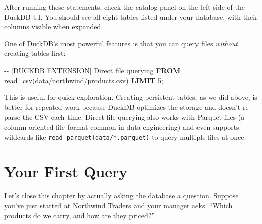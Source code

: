\documentclass[
  letterpaper,
  DIV=11,
  numbers=noendperiod]{scrreprt}
\newenvironment{Shaded}{\begin{snugshade}}{\end{snugshade}}
\newcommand{\CommentTok}[1]{\textcolor[rgb]{0.37,0.37,0.37}{#1}}
\newcommand{\DecValTok}[1]{\textcolor[rgb]{0.68,0.00,0.00}{#1}}
\newcommand{\KeywordTok}[1]{\textcolor[rgb]{0.00,0.23,0.31}{\textbf{#1}}}
\newcommand{\NormalTok}[1]{\textcolor[rgb]{0.00,0.23,0.31}{#1}}
\newcommand{\StringTok}[1]{\textcolor[rgb]{0.13,0.47,0.30}{#1}}
\begin{document}
After running these statements, check the catalog panel on the left side
of the DuckDB UI. You should see all eight tables listed under your
database, with their columns visible when expanded.

\begin{tcolorbox}[enhanced jigsaw, opacitybacktitle=0.6, arc=.35mm, colback=white, bottomtitle=1mm, opacityback=0, toprule=.15mm, left=2mm, colbacktitle=quarto-callout-tip-color!10!white, breakable, coltitle=black, toptitle=1mm, colframe=quarto-callout-tip-color-frame, bottomrule=.15mm, titlerule=0mm, title=\textcolor{quarto-callout-tip-color}{\faLightbulb}\hspace{0.5em}{DuckDB Reads Files Directly}, rightrule=.15mm, leftrule=.75mm]

One of DuckDB's most powerful features is that you can query files
\emph{without} creating tables first:

\begin{codelisting}[H]

\caption{\texttt{duckdb}}

\begin{Shaded}
\begin{Highlighting}[]
\CommentTok{{-}{-} [DUCKDB EXTENSION] Direct file querying}
\KeywordTok{FROM}\NormalTok{ read\_csv(}\StringTok{\textquotesingle{}data/northwind/products.csv\textquotesingle{}}\NormalTok{) }\KeywordTok{LIMIT} \DecValTok{5}\NormalTok{;}
\end{Highlighting}
\end{Shaded}

\end{codelisting}

This is useful for quick exploration. Creating persistent tables, as we
did above, is better for repeated work because DuckDB optimizes the
storage and doesn't re-parse the CSV each time. Direct file querying
also works with Parquet files (a column-oriented file format common in
data engineering) and even supports wildcards like
\texttt{read\_parquet(\textquotesingle{}data/*.parquet\textquotesingle{})}
to query multiple files at once.

\end{tcolorbox}

\section{Your First Query}\label{your-first-query}

Let's close this chapter by actually asking the database a question.
Suppose you've just started at Northwind Traders and your manager asks:
``Which products do we carry, and how are they priced?''
\end{document}
